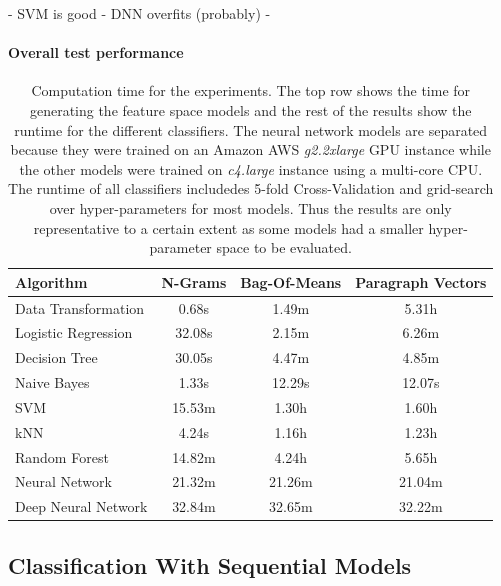 - SVM is good
- DNN overfits (probably)
-


\paragraph{Overall test performance}
\label{par:Overall test performance}

\begin{table}[h]
  \begin{center}
    \begin{tabular}{ l c c c }
      \toprule
      Algorithm & N-Grams & Bag-Of-Means & Paragraph Vectors \\
      \midrule
      Data Transformation & 0.68s & 1.49m & 5.31h \\
      \midrule
      Logistic Regression & 32.08s & 2.15m & 6.26m \\
      Decision Tree & 30.05s & 4.47m & 4.85m \\
      Naive Bayes & 1.33s & 12.29s & 12.07s \\
      SVM & 15.53m & 1.30h & 1.60h \\
      kNN & 4.24s & 1.16h & 1.23h \\
      Random Forest & 14.82m & 4.24h & 5.65h \\
      \midrule
      Neural Network & 21.32m & 21.26m & 21.04m \\
      Deep Neural Network & 32.84m & 32.65m & 32.22m \\
      \bottomrule
    \end{tabular}
  \caption{Computation time for the experiments. The top row shows the time for generating the feature space models and the rest of the results show the runtime for the different classifiers. The neural network models are separated because they were trained on an Amazon AWS \emph{g2.2xlarge} \gls{GPU} instance while the other models were trained on \emph{c4.large} instance using a multi-core CPU. The runtime of all classifiers includedes 5-fold \gls{Cross-Validation} and grid-search over hyper-parameters for most models. Thus the results are only representative to a certain extent as some models had a smaller hyper-parameter space to be evaluated.}
\label{tab:Computation}
\end{center}
\end{table}

\subsection{Classification With Sequential Models}
\label{sub:Classification With Sequential Models}


